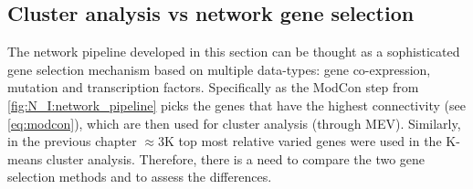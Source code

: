 



\subsection{Cluster analysis vs network gene selection} \label{s:N_I:cs_vs_gene_sel}

The network pipeline developed in this section can be thought as a sophisticated gene selection mechanism based on multiple data-types: gene co-expression, mutation and transcription factors. Specifically as the ModCon step from  \cref{fig:N_I:network_pipeline} picks the genes that have the highest connectivity (see \cref{eq:modcon}), which are then used for cluster analysis (through MEV). Similarly, in the previous chapter $\approx$3K top most relative varied genes were used in the K-means cluster analysis. Therefore, there is a need to compare the two gene selection methods and to assess the differences.

